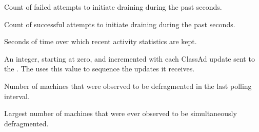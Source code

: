 \begin{description}
\item[\AdAttr{RecentDrainFailures}:] Count of failed attempts
to initiate draining during the past 
seconds.

\item[\AdAttr{RecentDrainSuccesses}:] Count of successful attempts
to initiate draining during the past 
seconds.

\item[\AdAttr{RecentStatsLifetime}:] Seconds of time over which
recent activity statistics are kept.

\item[\AdAttr{UpdateSequenceNumber}:] An integer, starting at zero,
  and incremented with each ClassAd update sent to the .
  The  uses this value to sequence the updates it
  receives.

\item[\AdAttr{WholeMachines}:] Number of machines that were observed
to be defragmented in the last polling interval.

\item[\AdAttr{WholeMachinesPeak}:] Largest number of machines that were
ever observed to be simultaneously defragmented.

\end{description}

